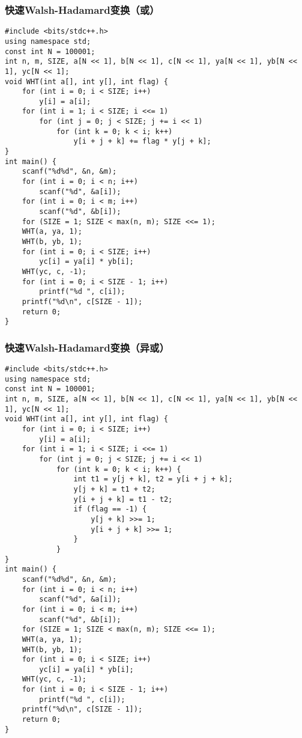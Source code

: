 \documentclass[a4paper]{article}
\begin{document}
\subsubsection{快速Walsh-Hadamard变换（或）}
\begin{lstlisting}
#include <bits/stdc++.h>
using namespace std;
const int N = 100001;
int n, m, SIZE, a[N << 1], b[N << 1], c[N << 1], ya[N << 1], yb[N << 1], yc[N << 1];
void WHT(int a[], int y[], int flag) {
    for (int i = 0; i < SIZE; i++)
        y[i] = a[i];
    for (int i = 1; i < SIZE; i <<= 1)
        for (int j = 0; j < SIZE; j += i << 1)
            for (int k = 0; k < i; k++)
                y[i + j + k] += flag * y[j + k];
}
int main() {
    scanf("%d%d", &n, &m);
    for (int i = 0; i < n; i++)
        scanf("%d", &a[i]);
    for (int i = 0; i < m; i++)
        scanf("%d", &b[i]);
    for (SIZE = 1; SIZE < max(n, m); SIZE <<= 1);
    WHT(a, ya, 1);
    WHT(b, yb, 1);
    for (int i = 0; i < SIZE; i++)
        yc[i] = ya[i] * yb[i];
    WHT(yc, c, -1);
    for (int i = 0; i < SIZE - 1; i++)
        printf("%d ", c[i]);
    printf("%d\n", c[SIZE - 1]);
    return 0;
}
\end{lstlisting}
\subsubsection{快速Walsh-Hadamard变换（异或）}
\begin{lstlisting}
#include <bits/stdc++.h>
using namespace std;
const int N = 100001;
int n, m, SIZE, a[N << 1], b[N << 1], c[N << 1], ya[N << 1], yb[N << 1], yc[N << 1];
void WHT(int a[], int y[], int flag) {
    for (int i = 0; i < SIZE; i++)
        y[i] = a[i];
    for (int i = 1; i < SIZE; i <<= 1)
        for (int j = 0; j < SIZE; j += i << 1)
            for (int k = 0; k < i; k++) {
                int t1 = y[j + k], t2 = y[i + j + k];
                y[j + k] = t1 + t2;
                y[i + j + k] = t1 - t2;
                if (flag == -1) {
                    y[j + k] >>= 1;
                    y[i + j + k] >>= 1;
                }
            }
}
int main() {
    scanf("%d%d", &n, &m);
    for (int i = 0; i < n; i++)
        scanf("%d", &a[i]);
    for (int i = 0; i < m; i++)
        scanf("%d", &b[i]);
    for (SIZE = 1; SIZE < max(n, m); SIZE <<= 1);
    WHT(a, ya, 1);
    WHT(b, yb, 1);
    for (int i = 0; i < SIZE; i++)
        yc[i] = ya[i] * yb[i];
    WHT(yc, c, -1);
    for (int i = 0; i < SIZE - 1; i++)
        printf("%d ", c[i]);
    printf("%d\n", c[SIZE - 1]);
    return 0;
}
\end{lstlisting}
\end{document}
